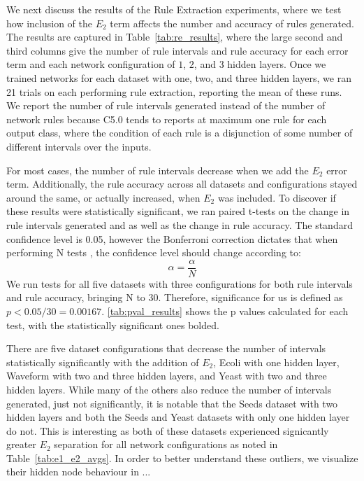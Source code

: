 We next discuss the results of the Rule Extraction experiments,
where we test how inclusion of the $E_2$ term affects the number
and accuracy of rules generated.
The results are
captured in Table~\ref{tab:re_results}, where the large second and
third columns
give the number of rule intervals and rule accuracy for each error term and
each network configuration of $1$, $2$, and $3$ hidden layers.
Once we trained networks for each dataset with
one, two, and three hidden layers, we ran 21 trials on each performing
rule extraction, reporting the mean of these runs. We report the
number of rule intervals generated instead of the number of network
rules because C5.0 tends to reports at maximum one rule for each output
class, where the condition of each rule is a disjunction of some number
of different intervals over the inputs.

For most cases, the number of rule intervals decrease when we add
the $E_2$ error term. Additionally, the rule accuracy across all
datasets and configurations stayed around the same, or actually
increased, when $E_2$ was included. To discover if these results were statistically
significant, we ran paired t-tests on the change in rule intervals
generated and as well as the change in rule accuracy. The standard
confidence level is 0.05, however the Bonferroni correction dictates
that when performing N tests \cite{shaffer1995multiple}, the confidence level should change according
to:
\begin{equation}
  \alpha = \frac{\alpha}{N}
\end{equation}
We run tests for all five datasets with three configurations for both
rule intervals and rule accuracy, bringing N to 30. Therefore,
significance for us is defined as $p < 0.05 / 30 =
0.00167$. \ref{tab:pval_results} shows the p values calculated for each
test, with the statistically significant ones bolded. 

There are five dataset configurations that decrease the number of
intervals statistically significantly with the addition of $E_2$, Ecoli with one
hidden layer, Waveform with two and three hidden layers, and Yeast
with two and three hidden layers. While many of the others also
reduce the number of intervals generated, just not significantly, it is notable that
the Seeds dataset with two hidden layers and both the
Seeds and Yeast datasets with only one
hidden layer do not. This is interesting as both of these datasets
experienced signicantly greater $E_2$ separation for all network
configurations as noted in Table~\ref{tab:e1_e2_avgs}. In order
to better understand these outliers, we visualize their hidden node
behaviour in ...

